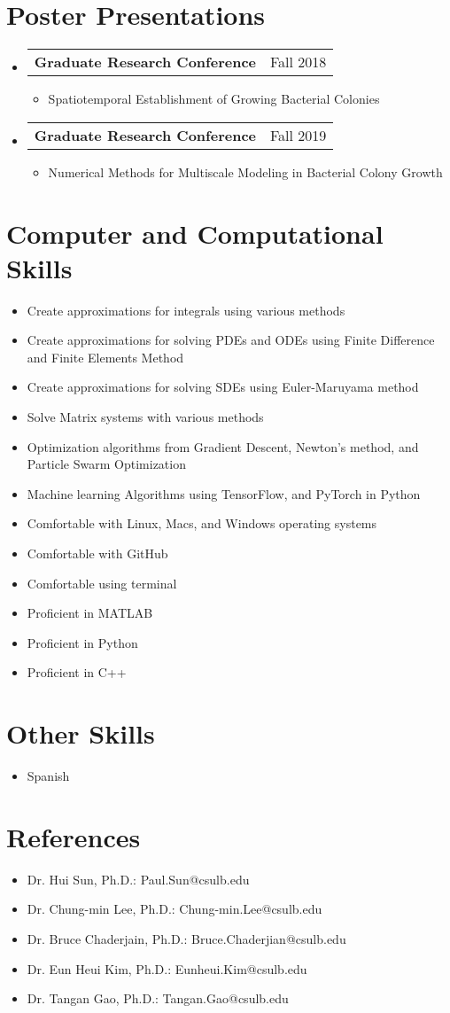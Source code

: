 \documentclass[letterpaper,11pt]{article}
\makeatletter
\newcommand{\resumeItem}[1]{
  \item\small{
    {#1 \vspace{-2pt}}
  }
}
\newcommand{\resumeProjectHeading}[2]{
    \item
    \begin{tabular*}{0.97\textwidth}{l@{\extracolsep{\fill}}r}
      \small#1 & #2 \\
    \end{tabular*}\vspace{-7pt}
}
\newcommand{\resumeSubHeadingListStart}{\begin{itemize}[leftmargin=0.15in, label={}]}
\newcommand{\resumeSubHeadingListEnd}{\end{itemize}}
\newcommand{\resumeItemListStart}{\begin{itemize}}
\newcommand{\resumeItemListEnd}{\end{itemize}\vspace{-5pt}}
\makeatother
\begin{document}
\section{Poster Presentations}
    \resumeSubHeadingListStart
      \resumeProjectHeading
          {\textbf{Graduate Research Conference}}{Fall 2018}
          \resumeItemListStart
            \resumeItem{Spatiotemporal Establishment of Growing Bacterial Colonies}
      \resumeItemListEnd
      \resumeProjectHeading
          {\textbf{Graduate Research Conference }}{Fall 2019}
          \resumeItemListStart
            \resumeItem{Numerical Methods for Multiscale Modeling in Bacterial Colony Growth}
      \resumeItemListEnd
    \resumeSubHeadingListEnd

\section{Computer and Computational Skills}
    \resumeSubHeadingListStart
      \resumeItemListStart
      \resumeItem{Create approximations for integrals using various methods}
      \resumeItem{Create approximations for solving PDEs and ODEs using Finite Difference and Finite Elements Method}
      \resumeItem{Create approximations for solving SDEs using Euler-Maruyama method}
      \resumeItem{Solve Matrix systems with various methods}
      \resumeItem{Optimization algorithms from Gradient Descent, Newton's method, and Particle Swarm Optimization}
      \resumeItem{Machine learning Algorithms using TensorFlow, and PyTorch in Python}
      \resumeItem{Comfortable with Linux, Macs, and Windows operating systems}
      \resumeItem{Comfortable with GitHub}
      \resumeItem{Comfortable using terminal}
      \resumeItem{Proficient in MATLAB}
      \resumeItem{Proficient in Python}
      \resumeItem{Proficient in C++}
      \resumeItemListEnd
    \resumeSubHeadingListEnd

\section{Other Skills}
    \resumeSubHeadingListStart
      \resumeItemListStart
        \resumeItem{Spanish}
      \resumeItemListEnd
    \resumeSubHeadingListEnd


\section{References}
    \resumeSubHeadingListStart
      \resumeItemListStart
      \resumeItem{Dr. Hui Sun, Ph.D.: Paul.Sun@csulb.edu}
      \resumeItem{Dr. Chung-min Lee, Ph.D.: Chung-min.Lee@csulb.edu}
      \resumeItem{Dr. Bruce Chaderjain, Ph.D.: Bruce.Chaderjian@csulb.edu }
      \resumeItem{Dr. Eun Heui Kim, Ph.D.: Eunheui.Kim@csulb.edu}
      \resumeItem{Dr. Tangan Gao, Ph.D.: Tangan.Gao@csulb.edu }
      \resumeItemListEnd
    \resumeSubHeadingListEnd

\end{document}

